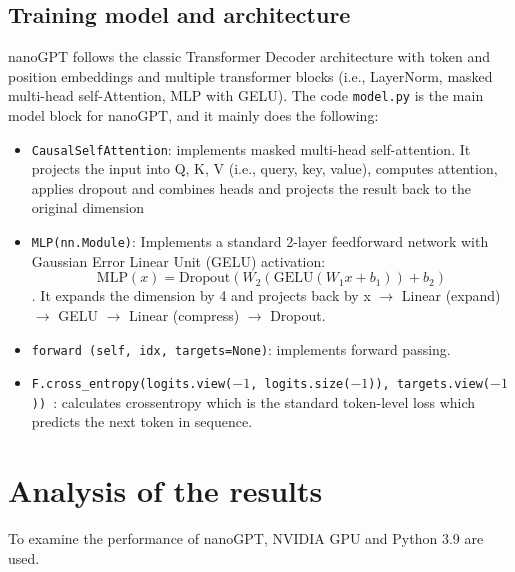 \documentclass{article} %
\begin{document}
\subsection{Training model and architecture}
nanoGPT follows the classic Transformer Decoder architecture with token and position embeddings and multiple transformer blocks (i.e., LayerNorm, masked multi-head self-Attention, MLP with GELU). The code \texttt{model.py} is the main model block for nanoGPT, and it mainly does the following:
\begin{itemize}
    \item \texttt{CausalSelfAttention}: implements masked multi-head self-attention. It projects the input into Q, K, V (i.e., query, key, value), computes attention, applies dropout and combines heads and projects the result back to the original dimension
    \item \texttt{MLP(nn.Module)}: Implements a standard 2-layer feedforward network with Gaussian Error Linear Unit (GELU) activation:
    \[
    \text{MLP}(x) = \text{Dropout}({W}_2(\text{GELU}({W}_1x + {b}_1)) + {b}_2)
    \]. It expands the dimension by 4 and projects back by x $\rightarrow$ Linear (expand) $\rightarrow$ GELU $\rightarrow$ Linear (compress) $\rightarrow$ Dropout.
    \item \texttt{forward (self, idx, targets=None)}: implements forward passing. 
    \item \texttt{F.cross\_entropy(logits.view($-1$, logits.size($-1$)), targets.view($-1$))
    }: calculates cross\-entropy which is the standard token-level loss which predicts the next token in sequence.

\end{itemize}


\section{Analysis of the results}
To examine the performance of nanoGPT, NVIDIA GPU and Python 3.9 are used. 
\end{document}
